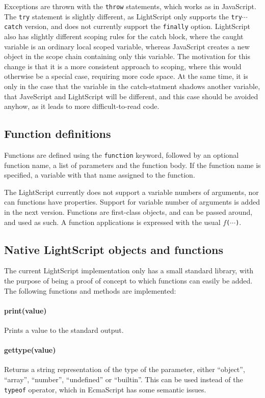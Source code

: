\documentclass[11pt]{report}
\begin{document}
Exceptions are thrown with the \verb|throw| statements, which works as in JavaScript.
The \verb|try| statement is slightly different, as LightScript only supports the \verb|try|$\cdots$\verb|catch| version, and does not currently support the \verb|finally| option.
LightScript also has slightly different scoping rules for the catch block, where the caught variable is an ordinary local scoped variable, whereas JavaScript creates a new object in the scope chain containing only this variable. The motivation for this change is that it is a more consistent approach to scoping, where this would otherwise be a special case, requiring more code space. 
At the same time, it is only in the case that the variable in the catch-statment shadows another variable, that JaveScript and LightScript will be different, and this case should be avoided anyhow, as it leads to more difficult-to-read code. 

\subsection{Function definitions}
Functions are defined using the \verb|function| keyword, followed by an optional function name, a list of parameters and the function body.
If the function name is specified, a variable with that name assigned to the function.

The LightScript currently does not support a variable numbers of arguments, nor can functions have properties.
Support for variable number of arguments is added in the next version.
Functions are first-class objects, and can be passed around, and used as such. A function applications is expressed with the usual $f$\verb|(|$\cdots$\verb|)|.

\subsection{Native LightScript objects and functions}
The current LightScript implementation only has a small standard library, with the purpose of being a proof of concept to which functions can easily be added. The following functions and methods are implemented:

\paragraph{print(value)} Prints a value to the standard output.
\paragraph{gettype(value)} Returns a string representation of the type of the parameter, either ``object'', ``array'', ``number'', ``undefined'' or ``builtin''. This can be used instead of the \verb|typeof| operator, which in EcmaScript has some semantic issues.
\end{document}

